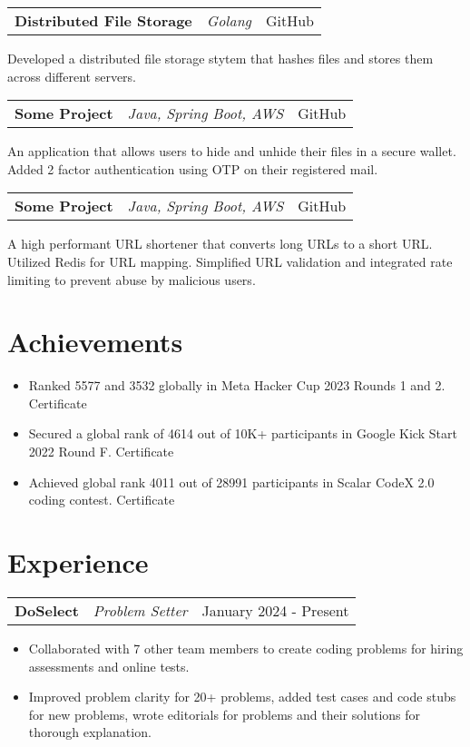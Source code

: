 \documentclass[a4paper,10pt]{article}
\makeatletter
\newenvironment{jobshort}[3]
    {
    \begin{tabularx}{\linewidth}{@{}l X r@{}}
    \textbf{#1} & \textit{#2} &  #3 \\[3pt]
    \end{tabularx}
    }
    {
    }
\newenvironment{joblong}[3]
    {
    \begin{tabularx}{\linewidth}{@{}l X r@{}}
    \textbf{#1} & \textit{#2} &  #3 \\[3pt]
    \end{tabularx}
    \begin{minipage}[t]{\linewidth}
    \begin{itemize}[nosep,after=\strut, leftmargin=1em, itemsep=2pt,label=--]
    }
    {
    \end{itemize}
    \end{minipage}    
    }
\makeatother
\begin{document}
\begin{jobshort}{Distributed File Storage}{Golang}{GitHub}
    Developed a distributed file storage stytem that hashes files and stores them across different servers.
\end{jobshort}

\begin{jobshort}{Some Project}{Java, Spring Boot, AWS}{GitHub}
    An application that allows users to hide and unhide their files in a secure wallet. Added 2 factor authentication using OTP
    on their registered mail.
\end{jobshort}

\begin{jobshort}{Some Project}{Java, Spring Boot, AWS}{GitHub}
    A high performant URL shortener that converts long URLs to a short URL. Utilized Redis for URL mapping. Simplified
    URL validation and integrated rate limiting to prevent abuse by malicious users.
\end{jobshort}

\vspace{-5pt}

\section{Achievements}
\vspace{-5pt}
\begin{itemize}
    \setlength\itemsep{-4pt} 
    \item Ranked 5577 and 3532 globally in Meta Hacker Cup 2023 Rounds 1 and 2. Certificate
    \item Secured a global rank of 4614 out of 10K+ participants in Google Kick Start 2022 Round F. Certificate
    \item Achieved global rank 4011 out of 28991 participants in Scalar CodeX 2.0 coding contest. Certificate
\end{itemize}
\vspace{-5pt}

\section{Experience}
\vspace{-5pt}
\begin{joblong}{DoSelect}{Problem Setter}{January 2024 - Present}
    \item Collaborated with 7 other team members to create coding problems for hiring assessments and online tests.
    \item Improved problem clarity for 20+ problems, added test cases and code stubs for new problems, wrote editorials for
    problems and their solutions for thorough explanation.
\end{joblong}
\end{document}
